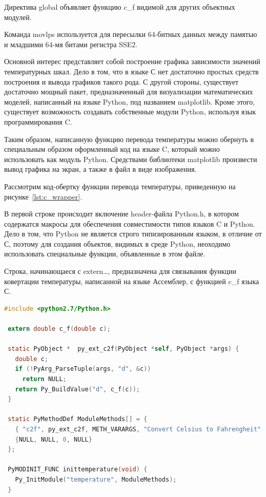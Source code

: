 Директива global объявляет функцию c\_f видимой для других объектных модулей. 

Команда movlps используется для пересылки 64-битных данных между памятью и 
младшими 64-мя битами регистра SSE2.

Основной интерес представляет собой построение графика зависимости
значений температурных шкал.
Дело в том, что в языке С нет достаточно простых
средств построения и вывода графиков такого рода.
С другой стороны, существует достаточно мощный пакет,
предназначенный для визуализации математических моделей,
написанный на языке Python, под названием matplotlib. 
Кроме этого, существует возможность создавать собственные модули Python,
используя язык программирования C.

Таким образом, написанную функцию перевода температуры можно обернуть
в специальным образом оформленный код на языке C, который можно использовать
как модуль Python. Средствами библиотеки matplotlib произвести вывод графика на экран,
а также в файл в виде изображения.

Рассмотрим код-обертку функции перевода температуры, приведенную на рисунке~\ref{lst:c_wrapper}.

В первой строке происходит включение header-файла Python.h, в котором
содержатся макросы для обеспечения совместимости типов языков C и Python.
Дело в том, что Python не является строго типизированным языком, 
в отличие от С, поэтому для создания объектов, видимых в среде Python, 
неоходимо использовать специальные функции, объявленные в этом файле.

Строка, начинающаеся с extern\dots, предназначена для связывания
функции ковертации температуры, написанной на языке Ассемблер,
с функцией c\_f языка С.

\pagebreak

\begin{lstlisting}[caption=Функция-обертка перевода температуры,
label=lst:c_wrapper,language={C},basicstyle=\scriptsize\ttfamily]
 #include <python2.7/Python.h>

 extern double c_f(double c);

 static PyObject *  py_ext_c2f(PyObject *self, PyObject *args) {
   double c;   
   if (!PyArg_ParseTuple(args, "d", &c))
     return NULL;
   return Py_BuildValue("d", c_f(c));
 }
 
 static PyMethodDef ModuleMethods[] = {
   { "c2f", py_ext_c2f, METH_VARARGS, "Convert Celsius to Fahrengheit" },
   {NULL, NULL, 0, NULL}
 };
 
 PyMODINIT_FUNC inittemperature(void) {
   Py_InitModule("temperature", ModuleMethods);
 }
\end{lstlisting}

